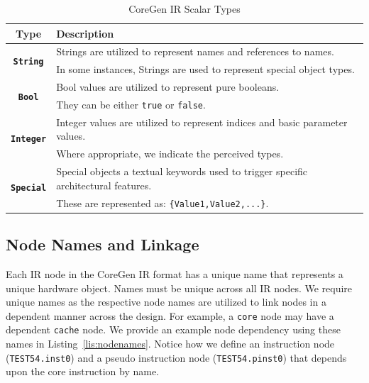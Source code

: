 \documentclass{article}
\begin{document}
\begin{table}[h]
\begin{center}
\caption{CoreGen IR Scalar Types}
\vspace{0.125in}
\label{tab:scalartypes}
\begin{tabular}{|c|l|}
\hline
\textbf{Type} & \textbf{Description}\\
\hline
\multirow{2}{*}{\textbf{\texttt{String}}} & Strings are utilized to represent names and references to names.\\
					                   & In some instances, Strings are used to represent special object types.\\
\hline
\multirow{2}{*}{\textbf{\texttt{Bool}}} & Bool values are utilized to represent pure booleans.\\
                                                               & They can be either \texttt{true} or \texttt{false}.\\
\hline
\multirow{2}{*}{\textbf{\texttt{Integer}}} & Integer values are utilized to represent indices and basic parameter values.\\
                                                                   & Where appropriate, we indicate the perceived types.\\
\hline
\multirow{2}{*}{\textbf{\texttt{Special}}} & Special objects a textual keywords used to trigger specific architectural features.\\
                                                                     & These are represented as: \texttt{\{Value1,Value2,...\}}.\\
\hline
\end{tabular}
\end{center}
\end{table}  

\subsection{Node Names and Linkage}
\label{sec:NameNamesAndLinkage}

Each IR node in the CoreGen IR format has a unique name that represents a unique hardware object.  Names must be 
unique across all IR nodes.  We require unique names as the respective node names are utilized to link nodes in a 
dependent manner across the design.  For example, a \texttt{core} node may have a dependent \texttt{cache} node.  We provide 
an example node dependency using these names in Listing~\ref{lis:nodenames}.  Notice how we define an instruction node (\texttt{TEST54.inst0}) 
and a pseudo instruction node (\texttt{TEST54.pinst0}) that depends upon the core instruction by name.
\end{document}
